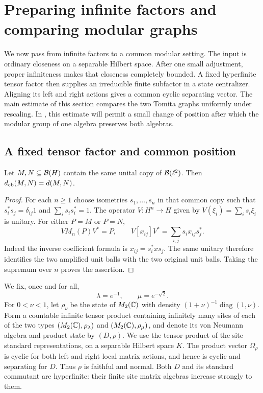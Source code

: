 \section{Preparing infinite factors and comparing modular graphs}
\label{sec:modular-preparation}

We now pass from infinite factors to a common modular setting.  The input is
ordinary closeness on a separable Hilbert space.  After one small adjustment,
proper infiniteness makes that closeness completely bounded.  A fixed
hyperfinite tensor factor then supplies an irreducible finite subfactor in a
state centralizer.  Aligning its left and right actions gives a common cyclic
separating vector.  The main estimate of this section compares the two Tomita
graphs uniformly under rescaling.  In , this
estimate will permit a small change of position after which the modular
group of one algebra preserves both algebras.

\subsection{A fixed tensor factor and common position}

\begin{lemma}
\label{lem:common-infinite-amplification}
Let $M,N\subseteq\mathcal B(H)$ contain the same unital copy of $\mathcal B(\ell^2)$.
Then $d_{\mathrm{cb}}(M,N)=d(M,N)$.
\end{lemma}

\begin{proof}
For each $n\geq1$ choose isometries $s_1,\ldots,s_n$ in that common copy
such that $s_i^*s_j=\delta_{ij}1$ and $\sum_i s_is_i^*=1$.
The operator $V:H^n\to H$ given by $V(\xi_i)=\sum_i s_i\xi_i$ is unitary.
For either $P=M$ or $P=N$,
\[
 V M_n(P)V^*=P,
 \qquad V[x_{ij}]V^*=\sum_{i,j}s_ix_{ij}s_j^*.
\]
Indeed the inverse coefficient formula is $x_{ij}=s_i^*xs_j$.
The same unitary therefore identifies the two amplified unit balls with the
two original unit balls.  Taking the supremum over $n$ proves the assertion.
\end{proof}

We fix, once and for all,
\[
 \lambda=e^{-1},\qquad \mu=e^{-\sqrt2}.
\]
For $0<\nu<1$, let $\rho_\nu$ be the state of $M_2(\mathbb C)$ with density
$(1+\nu)^{-1}\operatorname{diag}(1,\nu)$.  Form a countable infinite
tensor product containing infinitely many sites of each of the two types
$(M_2(\mathbb C),\rho_\lambda)$ and $(M_2(\mathbb C),\rho_\mu)$, and denote its von
Neumann algebra and product state by $(D,\rho)$.  We use the tensor product
of the site standard representations, on a separable Hilbert space $K$.
The product vector $\Omega_\rho$ is cyclic for both left and right local matrix actions,
and hence is cyclic and separating for $D$.  Thus $\rho$ is faithful and
normal.  Both $D$ and its standard commutant are hyperfinite: their finite
site matrix algebras increase strongly to them.

